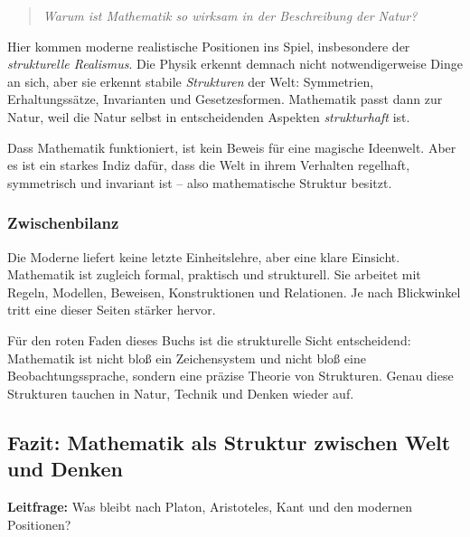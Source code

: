 \medskip
\begin{quote}
	\emph{Warum ist Mathematik so wirksam in der Beschreibung der Natur?}
\end{quote}
\medskip

Hier kommen moderne realistische Positionen ins Spiel,
insbesondere der \emph{strukturelle Realismus}.
Die Physik erkennt demnach nicht notwendigerweise Dinge an sich,
aber sie erkennt stabile \emph{Strukturen} der Welt:
Symmetrien,
Erhaltungssätze,
Invarianten
und Gesetzesformen.
Mathematik passt dann zur Natur,
weil die Natur selbst in entscheidenden Aspekten \emph{strukturhaft} ist.

\begin{DidacticBox}
	\label{box:ohne-mystik}
	\small
	Dass Mathematik funktioniert,
	ist kein Beweis für eine magische Ideenwelt.
	Aber es ist ein starkes Indiz dafür,
	dass die Welt in ihrem Verhalten regelhaft,
	symmetrisch und invariant ist --
	also mathematische Struktur besitzt.
\end{DidacticBox}

\subsubsection*{Zwischenbilanz}

Die Moderne liefert keine letzte Einheitslehre,
aber eine klare Einsicht.
Mathematik ist zugleich formal,
praktisch
und strukturell.
Sie arbeitet mit Regeln,
Modellen,
Beweisen,
Konstruktionen
und Relationen.
Je nach Blickwinkel tritt eine dieser Seiten stärker hervor.

Für den roten Faden dieses Buchs ist die strukturelle Sicht entscheidend:
Mathematik ist nicht bloß ein Zeichensystem
und nicht bloß eine Beobachtungssprache,
sondern eine präzise Theorie von Strukturen.
Genau diese Strukturen tauchen in Natur,
Technik und Denken wieder auf.


\subsection{Fazit: Mathematik als Struktur zwischen Welt und Denken}
\label{sec:8.5}

\textbf{Leitfrage:} Was bleibt nach Platon, Aristoteles, Kant und den modernen Positionen?

